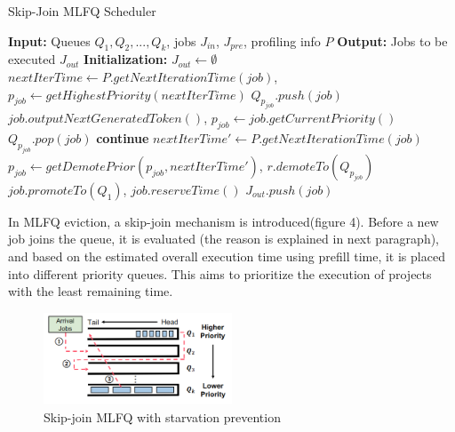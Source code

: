 \documentclass[conference]{IEEEtran}
\begin{document}
\begin{algorithm}
    \caption{Skip-Join MLFQ Scheduler  \cite{b10}}
    \begin{algorithmic}
        \State \textbf{Input:} Queues $Q_1, Q_2, ..., Q_k$, jobs $J_{in}$, $J_{pre}$, profiling info $P$
        \State \textbf{Output:} Jobs to be executed $J_{out}$
        \State \textbf{Initialization:} $J_{out} \leftarrow \emptyset$
        \State $nextIterTime \leftarrow P.getNextIterationTime(job)$, $p_{job} \leftarrow getHighestPriority(nextIterTime)$
        \State $Q_{p_{job}}.push(job)$
        \EndFor
        \State $job.outputNextGeneratedToken()$, $p_{job} \leftarrow job.getCurrentPriority()$
        \State $Q_{p_{job}}.pop(job)$
        \State \textbf{continue}
        \EndIf
        \State $nextIterTime' \leftarrow P.getNextIterationTime(job)$
        \State $p_{job}\leftarrow getDemotePrior(p_{job}, nextIterTime')$, $r.demoteTo(Q_{p_{job}})$
        \EndIf
        \EndFor
        \State $job.promoteTo(Q_1)$, $job.reserveTime()$
        \EndIf
        \EndFor
        \EndFor
        \State $J_{out}.push(job)$
        \EndIf
        \EndFor
        \EndFor
        \EndProcedure
    \end{algorithmic}
\end{algorithm}
In MLFQ eviction, a skip-join mechanism is introduced(figure 4). Before a new job joins the queue, it is evaluated (the reason is explained in next paragraph), and based on the estimated overall execution time using prefill time, it is placed into different priority queues. This aims to prioritize the execution of projects with the least remaining time.

\begin{figure}[htbp]
    \centerline{\includegraphics[width=0.5\textwidth]{process fig4.png}}
    \caption{Skip-join MLFQ with starvation prevention}
    \label{fig}
\end{figure}
\end{document}
